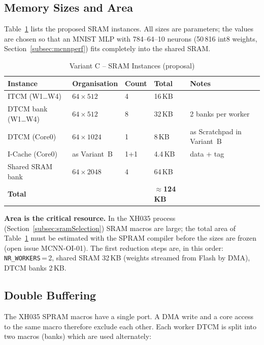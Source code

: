 \subsection{Memory Sizes and Area}
\label{subsec:mcnnsizes}

Table~\ref{tab:mcnnsram} lists the proposed SRAM instances. All sizes are
parameters; the values are chosen so that an MNIST MLP with
784--64--10 neurons (50\,816 int8 weights, Section~\ref{subsec:mcnnperf})
fits completely into the shared SRAM.

\begin{table}[H]
\caption{Variant C -- SRAM Instances (proposal)}
\label{tab:mcnnsram}
\centering
{\footnotesize
\begin{tabularx}{\textwidth}{|l |l |l |l |X|}
  \hline
  Instance & Organisation & Count & Total & Notes \\
  \hline
  \hline
  ITCM (W1\ldots W4) & $64 \times 512$ & 4 & 16\,KB & \\
  \hline
  DTCM bank (W1\ldots W4) & $64 \times 512$ & 8 & 32\,KB & 2 banks per worker \\
  \hline
  DTCM (Core0) & $64 \times 1024$ & 1 & 8\,KB & as Scratchpad in Variant~B \\
  \hline
  I-Cache (Core0) & as Variant~B & 1+1 & 4.4\,KB & data + tag \\
  \hline
  Shared SRAM bank & $64 \times 2048$ & 4 & 64\,KB & \\
  \hline
  \multicolumn{3}{|l|}{\textbf{Total}} & \textbf{$\approx$124\,KB} & \\
  \hline
\end{tabularx}}
\end{table}

\textbf{Area is the critical resource.} In the XH035 process
(Section~\ref{subsec:sramSelection}) SRAM macros are large; the total area
of Table~\ref{tab:mcnnsram} must be estimated with the SPRAM compiler before
the sizes are frozen (open issue MCNN-OI-01). The first reduction steps are,
in this order: \texttt{NR\_WORKERS}\,=\,2, shared SRAM 32\,KB (weights
streamed from Flash by DMA), DTCM banks 2\,KB.

\subsection{Double Buffering}
\label{subsec:mcnnpingpong}

The XH035 SPRAM macros have a single port. A DMA write and a core access to
the same macro therefore exclude each other. Each worker DTCM is split into
two macros (banks) which are used alternately:

